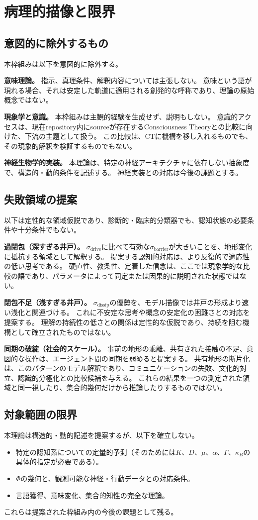 \section{病理的描像と限界}
\label{sec:pathologies}

\subsection{意図的に除外するもの}
本枠組みは以下を意図的に除外する。

\textbf{意味理論。}
指示、真理条件、解釈内容については主張しない。
意味という語が現れる場合、それは安定した軌道に適用される創発的な呼称であり、理論の原始概念ではない。

\textbf{現象学と意識。}
本枠組みは主観的経験を生成せず、説明もしない。
意識的アクセスは、現在repository内にsourceが存在するConsciousness Theoryとの比較に向けた、下流の主題として扱う。
この比較は、CTに機構を移し入れるものでも、その現象的解釈を検証するものでもない。

\textbf{神経生物学的実装。}
本理論は、特定の神経アーキテクチャに依存しない抽象度で、構造的・動的条件を記述する。
神経実装との対応は今後の課題とする。

\subsection{失敗領域の提案}
以下は定性的な領域仮説であり、診断的・臨床的分類器でも、認知状態の必要条件や十分条件でもない。

\textbf{過閉包（深すぎる井戸）。}
$\sigma_{\mathrm{drive}}$に比べて有効な$\sigma_{\mathrm{barrier}}$が大きいことを、地形変化に抵抗する領域として解釈する。
提案する認知的対応は、より反復的で適応性の低い思考である。
硬直性、教条性、定着した信念は、ここでは現象学的な比較の語であり、パラメータによって同定または因果的に説明された状態ではない。

\textbf{閉包不足（浅すぎる井戸）。}
$\sigma_{\mathrm{dissip}}$の優勢を、モデル描像では井戸の形成より速い浅化と関連づける。
これに不安定な思考や概念の安定化の困難さとの対応を提案する。
理解の持続性の低さとの関係は定性的な仮説であり、持続を阻む機構として確立されたものではない。

\textbf{同期の破綻（社会的スケール）。}
事前の地形の乖離、共有された接触の不足、意図的な操作は、エージェント間の同期を弱めると提案する。
共有地形の断片化は、このパターンのモデル解釈であり、コミュニケーションの失敗、文化的対立、認識的分極化との比較候補を与える。
これらの結果を一つの測定された領域と同一視したり、集合的幾何だけから推論したりするものではない。

\subsection{対象範囲の限界}
本理論は構造的・動的記述を提案するが、以下を確立しない。
\begin{itemize}
\item 特定の認知系についての定量的予測（そのためには$K$、$D$、$\mu$、$\alpha$、$\Gamma$、$\kappa_B$の具体的指定が必要である）。
\item $\Phi$の幾何と、観測可能な神経・行動データとの対応条件。
\item 言語獲得、意味変化、集合的知性の完全な理論。
\end{itemize}
これらは提案された枠組み内の今後の課題として残る。
